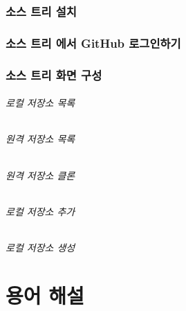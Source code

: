 \documentclass[12pt, a4paper, oneside]{book}
\let\stdsection\section
\renewcommand\section{\newpage\stdsection}
\begin{document}
%										
	\section{소스 트리 설치}

	\section{소스 트리 에서 GitHub 로그인하기}

	\section{소스 트리 화면 구성 }


	\paragraph 	{로컬 저장소 목록}
	\paragraph 	{원격 저장소 목록}
	\paragraph 	{원격 저장소 클론}
	\paragraph 	{로컬 저장소 추가}
	\paragraph 	{로컬 저장소 생성}





	\part{ 용어 해설  }
	\noptcrule
	\parttoc				


%										
\end{document}
